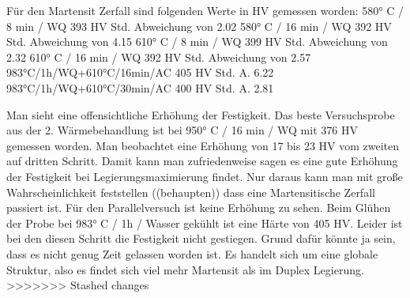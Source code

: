 Für den Martensit Zerfall sind folgenden Werte in HV gemessen worden: 
580° C / 8 min / WQ	393 HV		Std. Abweichung von 	2.02
580° C / 16 min / WQ	392 HV		Std. Abweichung von 	4.15
610° C / 8 min / WQ	399 HV		Std. Abweichung von 	2.32
610° C / 16 min / WQ	392 HV		Std. Abweichung von 	2.57
983°C/1h/WQ+610°C/16min/AC	405 HV		Std. A. 	6.22
983°C/1h/WQ+610°C/30min/AC	400 HV		Std. A. 	2.81

Man sieht eine offensichtliche Erhöhung der Festigkeit. Das beste Versuchsprobe aus der 2. Wärmebehandlung ist bei 950° C / 16 min / WQ mit 376 HV gemessen worden. Man beobachtet eine Erhöhung von 17 bis 23 HV vom zweiten auf dritten Schritt. Damit kann man zufriedenweise sagen es eine gute Erhöhung der Festigkeit bei Legierungsmaximierung findet. Nur daraus kann man mit große Wahrscheinlichkeit feststellen ((behaupten)) dass eine Martensitische Zerfall passiert ist. 
Für den Parallelversuch ist keine Erhöhung zu sehen. Beim Glühen der Probe bei 983° C / 1h / Wasser gekühlt ist eine Härte von 405 HV. Leider ist bei den diesen Schritt die Festigkeit nicht gestiegen. Grund dafür könnte ja sein, dass es nicht genug Zeit gelassen worden ist. Es handelt sich um eine globale Struktur, also es findet sich viel mehr Martensit als im Duplex Legierung. 
>>>>>>> Stashed changes
